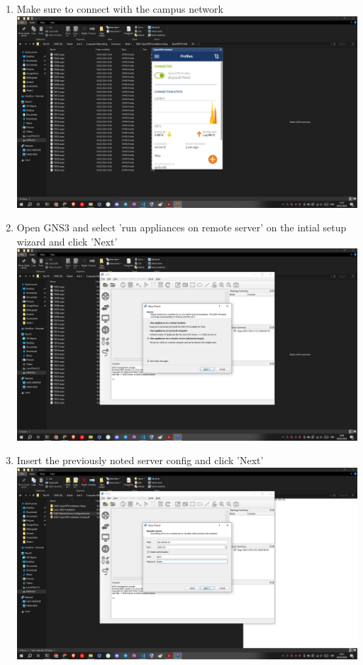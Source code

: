 \documentclass[12pt,titlepage]{article}
\begin{document}
\begin{enumerate}
    \item Make sure to connect with the campus network \\ \includegraphics[width=.9\textwidth]{images/figures/Screenshot (456).png}
    \item Open GNS3 and select 'run appliances on remote server' on the intial setup wizard and click 'Next' \\ \includegraphics[width=.9\textwidth]{images/figures/Screenshot (458).png}
    \newpage
    \item Insert the previously noted server config and click 'Next' \\ \includegraphics[width=.9\textwidth]{images/figures/Screenshot (459).png}

\end{enumerate}
\end{document}

